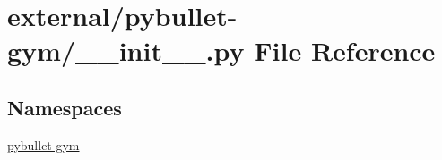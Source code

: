 \hypertarget{external_2pybullet-gym_2____init_____8py}{}\section{external/pybullet-\/gym/\+\_\+\+\_\+init\+\_\+\+\_\+.py File Reference}
\label{external_2pybullet-gym_2____init_____8py}
\subsection*{Namespaces}
\begin{DoxyCompactItemize}
\item 
 \hyperlink{namespacepybullet-gym}{pybullet-\/gym}
\end{DoxyCompactItemize}
